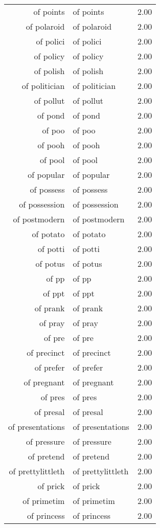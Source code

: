 \begin{table}[ht]
\begin{tabular}{rlr}
  of points & of points & 2.00 \\ 
  of polaroid & of polaroid & 2.00 \\ 
  of polici & of polici & 2.00 \\ 
  of policy & of policy & 2.00 \\ 
  of polish & of polish & 2.00 \\ 
  of politician & of politician & 2.00 \\ 
  of pollut & of pollut & 2.00 \\ 
  of pond & of pond & 2.00 \\ 
  of poo & of poo & 2.00 \\ 
  of pooh & of pooh & 2.00 \\ 
  of pool & of pool & 2.00 \\ 
  of popular & of popular & 2.00 \\ 
  of possess & of possess & 2.00 \\ 
  of possession & of possession & 2.00 \\ 
  of postmodern & of postmodern & 2.00 \\ 
  of potato & of potato & 2.00 \\ 
  of potti & of potti & 2.00 \\ 
  of potus & of potus & 2.00 \\ 
  of pp & of pp & 2.00 \\ 
  of ppt & of ppt & 2.00 \\ 
  of prank & of prank & 2.00 \\ 
  of pray & of pray & 2.00 \\ 
  of pre & of pre & 2.00 \\ 
  of precinct & of precinct & 2.00 \\ 
  of prefer & of prefer & 2.00 \\ 
  of pregnant & of pregnant & 2.00 \\ 
  of pres & of pres & 2.00 \\ 
  of presal & of presal & 2.00 \\ 
  of presentations & of presentations & 2.00 \\ 
  of pressure & of pressure & 2.00 \\ 
  of pretend & of pretend & 2.00 \\ 
  of prettylittleth & of prettylittleth & 2.00 \\ 
  of prick & of prick & 2.00 \\ 
  of primetim & of primetim & 2.00 \\ 
  of princess & of princess & 2.00 \\ 

\end{tabular}
\end{table}

